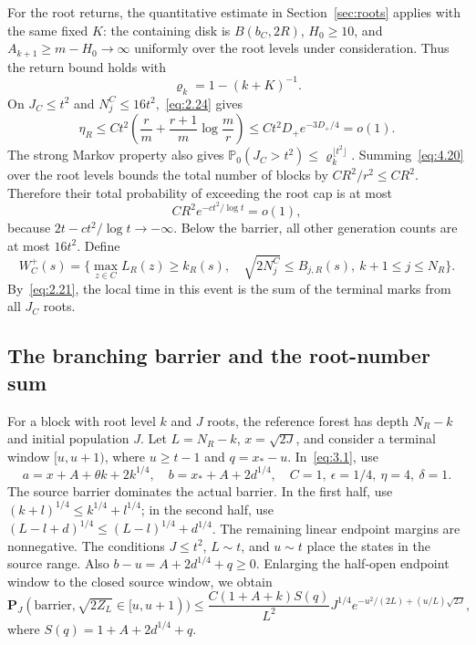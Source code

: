 \documentclass[11pt,a4paper]{article}
\numberwithin{equation}{section}
\theoremstyle{remark}
\begin{document}
For the root returns, the quantitative estimate in Section~\ref{sec:roots} applies with the same fixed $K$: the containing disk is $B(b_C,2R)$, $H_0\ge10$, and $A_{k+1}\ge m-H_0\to\infty$ uniformly over the root levels under consideration. Thus the return bound holds with
\begin{equation}\label{eq:4.21}
\varrho_k=1-(k+K)^{-1}.
\end{equation}
On $J_C\le t^2$ and $N_j^C\le16t^2$,~\eqref{eq:2.24} gives
\begin{equation}\label{eq:4.22}
\eta_R\le Ct^2\left(\frac rm+\frac{r+1}m\log\frac mr\right)
\le Ct^2D_+e^{-3D_+/4}=o(1).
\end{equation}
The strong Markov property also gives
$\mathbb P_0(J_C>t^2)\le\varrho_k^{\lfloor t^2\rfloor}$.
Summing~\eqref{eq:4.20} over the root levels bounds the total number of blocks by $CR^2/r^2\le CR^2$. Therefore their total probability of exceeding the root cap is at most
\begin{equation}\label{eq:4.23}
CR^2e^{-ct^2/\log t}=o(1),
\end{equation}
because $2t-ct^2/\log t\to-\infty$.
Below the barrier, all other generation counts are at most $16t^2$. Define
\begin{equation}\label{eq:4.24}
W_C^+(s)=\{\max_{z\in C}L_R(z)\ge k_R(s),\quad
\sqrt{2N_j^C}\le B_{j,R}(s),\ k+1\le j\le N_R\}.
\end{equation}
By~\eqref{eq:2.21}, the local time in this event is the sum of the terminal marks from all $J_C$ roots.

\subsection{The branching barrier and the root-number sum}\label{sec:uppergw}
For a block with root level $k$ and $J$ roots, the reference forest has depth $N_R-k$ and initial population $J$. Let $L=N_R-k$, $x=\sqrt{2J}$, and consider a terminal window $[u,u+1)$, where $u\ge t-1$ and $q=x_*-u$. In~\eqref{eq:3.1}, use
\begin{equation}\label{eq:4.25}
a=x+A+\theta k+2k^{1/4},\quad
b=x_*+A+2d^{1/4},\quad C=1,\ \epsilon=1/4,\ \eta=4,\ \delta=1.
\end{equation}
The source barrier dominates the actual barrier. In the first half, use
$(k+l)^{1/4}\le k^{1/4}+l^{1/4}$; in the second half, use
$(L-l+d)^{1/4}\le(L-l)^{1/4}+d^{1/4}$. The remaining linear endpoint margins are nonnegative. The conditions $J\le t^2$, $L\sim t$, and $u\sim t$ place the states in the source range. Also $b-u=A+2d^{1/4}+q\ge0$. Enlarging the half-open endpoint window to the closed source window, we obtain
\begin{equation}\label{eq:4.26}
\mathbf P_J(\text{barrier},\sqrt{2Z_L}\in[u,u+1))
\le\frac{C(1+A+k)S(q)}{L^2}J^{1/4}
 e^{-u^2/(2L)+(u/L)\sqrt{2J}},
\end{equation}
where $S(q)=1+A+2d^{1/4}+q$.
\end{document}
